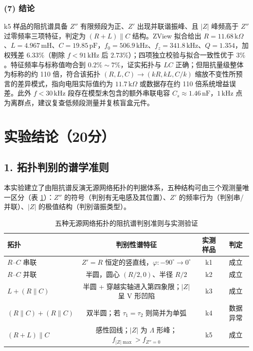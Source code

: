 \documentclass[12pt,a4paper]{ctexart}
\begin{document}
\subsubsection*{(7) 结论}
k5 样品的阻抗谱具备 $Z''$ 有限频段为正、$Z'$ 出现并联谐振峰、且 $|Z|$ 峰频高于 $Z''$ 过零频率三项特征，判定为 $(R+L)\parallel C$ 结构。ZView 拟合给出 $R=11.68\,\mathrm{k}\Omega$、$L=4.967\,\mathrm{mH}$、$C=19.85\,\mathrm{pF}$，$f_0=506.9\,\mathrm{kHz}$、$f_z=341.8\,\mathrm{kHz}$、$Q=1.354$，加权残差 $6.33\%$（剔除 $f<91\,\mathrm{kHz}$ 后 $2.73\%$）；四项独立校验与拟合一致性优于 $3\%$。特征频率与标称值吻合到 $0.2\%\sim7\%$，证实拓扑与 $LC$ 正确；但阻抗量级整体为标称的约 110 倍，符合该拓扑 $(R,L,C)\to(kR,kL,C/k)$ 缩放不变性所预言的差异模式，指向电阻实际值约为 $11.7\,\mathrm{k}\Omega$ 或数据存在约 110 倍系统增益误差。此外 $f<30\,\mathrm{kHz}$ 段存在模型未包含的额外串联电容 $C_s\approx1.46\,\mathrm{nF}$，$1\,\mathrm{kHz}$ 点为离群点，建议复查低频段测量并复核盲盒元件。

\section*{实验结论（20分）}

\subsection*{1. 拓扑判别的谱学准则}
本实验建立了由阻抗谱反演无源网络拓扑的判据体系，五种结构可由三个观测量唯一区分（表 \ref{tab:criterion}）：$Z''$ 的符号（判别有无电感及其位置）、$Z'$ 的频率行为（判别串/并联）、$|Z|$ 的极值结构（判别谐振类型）。

\begin{table}[htbp]\centering\small
\caption{五种无源网络拓扑的阻抗谱判别准则与实测验证}\label{tab:criterion}
\begin{tabular}{l|c|c|c}
\hline
拓扑 & 判别性谱特征 & 实测样品 & 判定 \\
\hline
$R$--$C$ 串联 & $Z'=R$ 恒定的竖直线，$\varphi:-90^\circ\to0^\circ$ & k1 & 成立 \\
$R$--$C$ 并联 & 半圆，圆心 $(R/2,0)$、半径 $R/2$ & k2 & 成立 \\
$L+(R\parallel C)$ & 半圆 + 穿越实轴进入第四象限；$|Z|$ 呈 V 形凹陷 & k3 & 成立 \\
$(R\parallel C)+(R\parallel C)$ & 双半圆；若 $\tau_1=\tau_2$ 则简并为单弧 & k4 & 数据异常 \\
$(R+L)\parallel C$ & 感性回线；$|Z|$ 为 $\Lambda$ 形峰；$f_{|Z|\max}>f_{Z''=0}$ & k5 & 成立 \\
\hline
\end{tabular}
\end{table}
\end{document}
